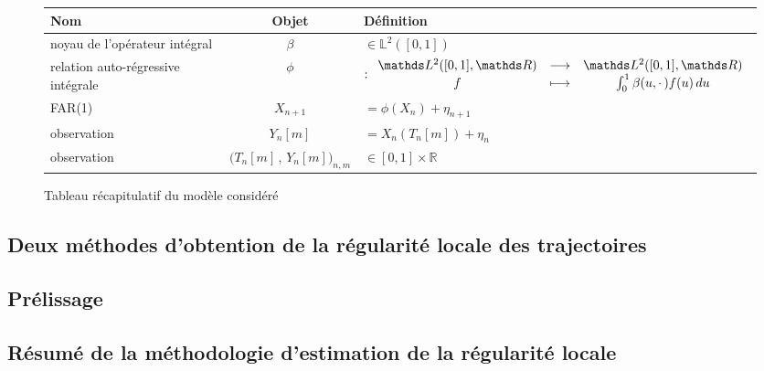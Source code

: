 \begin{figure}[H]
	\noindent\begin{tabularx}{\textwidth}{XcX}
		\toprule
		\textbf{Nom}                       & \textbf{Objet}                              & \textbf{Définition}                                                                                                \\
		\midrule
		noyau de l'opérateur intégral      & $\beta$                                     & $\in \mathds L^2([0,1])$                                                                                           \\
		relation auto-régressive intégrale & $\phi$                                      & $: \func{\mathds L^2([0,1], \mathds R)}{\mathds L^2([0,1], \mathds R)}{f}{\int_0^1 \beta(u, \cdot \, )f(u) \, du}$ \\
		FAR(1)                             & $X_{n+1}$                                   & $= \phi( X_n )+ \eta_{n+1}$                                                                                        \\
		\midrule
		observation                        & $Y_n[m]$                                    & $= X_n( T_n[m] ) + \eta_n $                                                                                        \\
		observation                        & $\bigl( T_n[m] \, , \, Y_n[m] \bigr)_{n,m}$ & $\in [0,1] \times \mathds R$                                                                                       \\
		\bottomrule
	\end{tabularx}
	\label{tab:model}
	\caption{Tableau récapitulatif du modèle considéré}
\end{figure}

\subsection{Deux méthodes d'obtention de la régularité locale des trajectoires}




\subsection{Prélissage}



\subsection{Résumé de la méthodologie d'estimation de la régularité locale}



